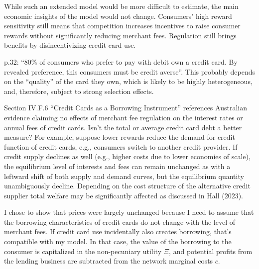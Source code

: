\documentclass[main.tex]{subfiles}
\begin{document}
\begin{refsection}
While such an extended model would be more difficult to estimate, the main economic insights of the model would not change.
Consumers' high reward sensitivity still means that competition increases incentives to raise consumer rewards without significantly reducing merchant fees.
Regulation still brings benefits by disincentivizing credit card use.

\begin{refcommentnoclear}
p.32: “80\% of consumers who prefer to pay with debit own a credit card.
By revealed preference, this consumers must be credit averse”.
This probably depends on the “quality” of the card they own, which is likely to be highly heterogeneous, and, therefore, subject to strong selection effects.
\end{refcommentnoclear}

\replypricediscrimination

\begin{refcommentnoclear}
Section IV.F.6 “Credit Cards as a Borrowing Instrument” references Australian evidence claiming no effects of merchant fee regulation on the interest rates or annual fees of credit cards.
Isn't the total or average credit card debt a better measure?
For example, suppose lower rewards reduce the demand for credit function of credit cards, e.g., consumers switch to another credit provider.
If credit supply declines as well (e.g., higher costs due to lower economies of scale), the equilibrium level of interests and fees can remain unchanged as with a leftward shift of both supply and demand curves, but the equilibrium quantity unambiguously decline.
Depending on the cost structure of the alternative credit supplier total welfare may be significantly affected as discussed in Hall (2023).
\end{refcommentnoclear}

I chose to show that prices were largely unchanged because I need to assume that the borrowing characteristics of credit cards do not change with the level of merchant fees.
If credit card use incidentally also creates borrowing, that's compatible with my model.
In that case, the value of the borrowing to the consumer is capitalized in the non-pecuniary utility $\Xi$, and potential profits from the lending business are subtracted from the network marginal costs $c$.

\clearpage
\printbibliography
\end{refsection}
\clearpage

\setcounter{footnote}{0}
\setcounter{page}{1}
\renewcommand{\thepage}{R3-\arabic{page}}
\end{document}
